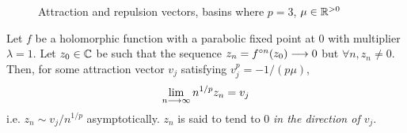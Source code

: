 \documentclass[../main.tex]{subfiles}
\begin{document}
\begin{figure}
    \label{10:fig:basins}
    \centering
    
    \caption{Attraction and repulsion vectors, basins where $p = 3$, $\mu\in\mathbb{R}^{> 0}$}
\end{figure}

\begin{thm}
    \label{10:thm:arvec-ir}
    Let $f$ be a holomorphic function with a parabolic fixed point at 0 with multiplier $\lambda = 1$. Let $z_0\in\mathbb{C}$ be such that the sequence $z_n=f^{\circ n}(z_0)\longrightarrow 0$ but $\forall n, z_n\ne 0$. Then, for some attraction vector $v_j$ satisfying $v_j^p=-1/(p\mu)$,
    \begin{equation*}
        \lim_{n\longrightarrow\infty} n^{1/p} z_n = v_j
    \end{equation*}
    i.e. $z_n\sim v_j/n^{1/p}$ asymptotically. $z_n$ is said to tend to 0 \emph{in the direction of $v_j$}.
\end{thm}
\end{document}
